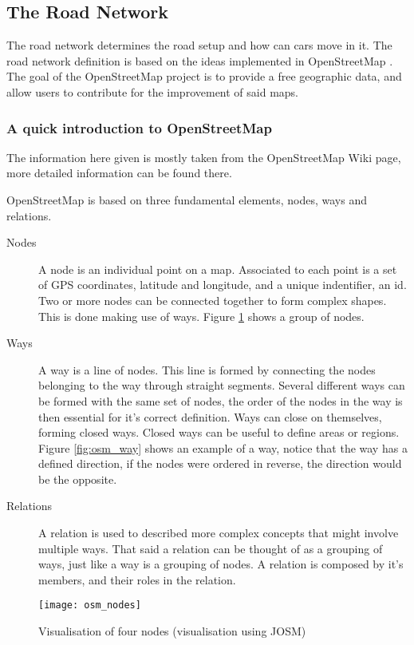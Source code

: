 \subsection{The Road Network}
\label{sec:theroadnetwork}

The road network determines the road setup and how can cars move in it. The road network definition is based on the ideas implemented in OpenStreetMap \cite{OSM}. The goal of the OpenStreetMap project is to provide a free geographic data, and allow users to contribute for the improvement of said maps.

\subsubsection{A quick introduction to OpenStreetMap}

The information here given is mostly taken from the OpenStreetMap Wiki page, more detailed information can be found there.

OpenStreetMap is based on three fundamental elements, nodes, ways and relations.

\begin{description}
  \item[Nodes] A node is an individual point on a map. Associated to each point is a set of GPS coordinates, latitude and longitude, and a unique indentifier, an id. Two or more nodes can be connected together to form complex shapes. This is done making use of ways. Figure \ref{fig:osm_nodes} shows a group of nodes.
  \item[Ways] A way is a line of nodes. This line is formed by connecting the nodes belonging to the way through straight segments. Several different ways can be formed with the same set of nodes, the order of the nodes in the way is then essential for it's correct definition. Ways can close on themselves, forming closed ways. Closed ways can be useful to define areas or regions. Figure \ref{fig:osm_way} shows an example of a way, notice that the way has a defined direction, if the nodes were ordered in reverse, the direction would be the opposite.
  \item[Relations]A relation is used to described more complex concepts that might involve multiple ways. That said a relation can be thought of as a grouping of ways, just like a way is a grouping of nodes. A relation is composed by it's members, and their roles in the relation.
\end{description}

\begin{figure}[h!]
  \centering
    \texttt{[image: osm\_nodes]}
    \caption{Visualisation of four nodes (visualisation using JOSM) \label{fig:osm_nodes} }
\end{figure}

